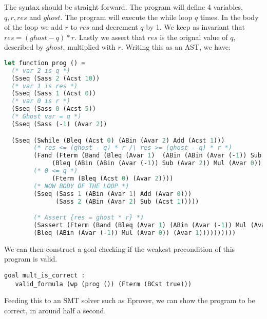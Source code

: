 The syntax should be straight forward. The program will define 4 variables, $q,r,res$ and $ghost$.
The program will execute the while loop $q$ times. In the body of the loop we add $r$ to $res$ and decrement $q$ by 1. We keep as invariant that $res = (ghost - q) * r$. Lastly we assert that $res$ is the orignal value of $q$, described by $ghost$, multiplied with $r$.
Writing this as an AST, we have:

\begin{lstlisting}[caption={WHILE AST in why3},label={lst:whileast},language=sml]
let function prog () =
  (* var 2 is q *)
  (Sseq (Sass 2 (Acst 10))
  (* var 1 is res *)
  (Sseq (Sass 1 (Acst 0))
  (* var 0 is r *)
  (Sseq (Sass 0 (Acst 5))
  (* Ghost var = q *)
  (Sseq (Sass (-1) (Avar 2))

  (Sseq (Swhile (Bleq (Acst 0) (ABin (Avar 2) Add (Acst 1)))
        (* res <= (ghost - q) * r /\ res >= (ghost - q) * r *)
        (Fand (Fterm (Band (Bleq (Avar 1)  (ABin (ABin (Avar (-1)) Sub (Avar 2)) Mul (Avar 0)))
             (Bleq (ABin (ABin (Avar (-1)) Sub (Avar 2)) Mul (Avar 0)) (Avar 1))))
        (* 0 <= q *)
             (Fterm (Bleq (Acst 0) (Avar 2))))
        (* NOW BODY OF THE LOOP *)
        (Sseq (Sass 1 (ABin (Avar 1) Add (Avar 0)))
              (Sass 2 (ABin (Avar 2) Sub (Acst 1)))))

        (* Assert {res = ghost * r} *)
        (Sassert (Fterm (Band (Bleq (Avar 1) (ABin (Avar (-1)) Mul (Avar 0)))
        (Bleq (ABin (Avar (-1)) Mul (Avar 0)) (Avar 1))))))))))
      \end{lstlisting}

We can then construct a goal checking if the weakest precondition of this program is valid.

\begin{lstlisting}
goal mult_is_correct :
   valid_formula (wp (prog ()) (Fterm (BCst true)))
\end{lstlisting}

Feeding this to an SMT solver such as Eprover, we can show the program to be correct, in around half a second.
